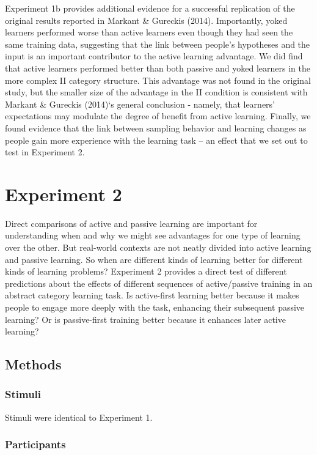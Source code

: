 \documentclass[10pt, letterpaper]{article}
\begin{document}
Experiment 1b provides additional evidence for a successful replication
of the original results reported in Markant \& Gureckis (2014).
Importantly, yoked learners performed worse than active learners even
though they had seen the same training data, suggesting that the link
between people's hypotheses and the input is an important contributor to
the active learning advantage. We did find that active learners
performed better than both passive and yoked learners in the more
complex II category structure. This advantage was not found in the
original study, but the smaller size of the advantage in the II
condition is consistent with Markant \& Gureckis (2014)`s general
conclusion - namely, that learners' expectations may modulate the degree
of benefit from active learning. Finally, we found evidence that the
link between sampling behavior and learning changes as people gain more
experience with the learning task -- an effect that we set out to test
in Experiment 2.

\section{Experiment 2}\label{experiment-2}

Direct comparisons of active and passive learning are important for
understanding when and why we might see advantages for one type of
learning over the other. But real-world contexts are not neatly divided
into active learning and passive learning. So when are different kinds
of learning better for different kinds of learning problems? Experiment
2 provides a direct test of different predictions about the effects of
different sequences of active/passive training in an abstract category
learning task. Is active-first learning better because it makes people
to engage more deeply with the task, enhancing their subsequent passive
learning? Or is passive-first training better because it enhances later
active learning?

\subsection{Methods}\label{methods-2}

\subsubsection{Stimuli}\label{stimuli-2}

Stimuli were identical to Experiment 1.

\subsubsection{Participants}\label{participants-2}
\end{document}
